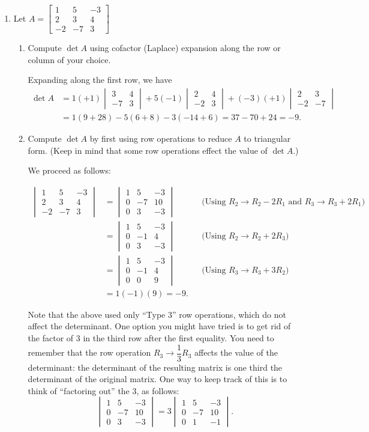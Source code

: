\documentclass[12pt]{article}
\newcommand{\bbm}{\begin{bmatrix}}
\newcommand{\ebm}{\end{bmatrix}}
\newcommand{\bvm}{\begin{vmatrix}}
\newcommand{\evm}{\end{vmatrix}}
\begin{document}
\thispagestyle{fancy}
 \begin{enumerate}
  \item Let $A = \bbm 1&5&-3\\2&3&4\\-2&-7&3\ebm$
\begin{enumerate}
 \item Compute $\det A$ using cofactor (Laplace) expansion along the row or column of your choice.

\bigskip

Expanding along the first row, we have
\begin{align*}
 \det A &= 1(+1)\bvm 3&4\\-7&3\evm + 5(-1)\bvm 2&4\\-2&3\evm + (-3)(+1)\bvm 2&3\\-2&-7\evm\\
&= 1(9+28)-5(6+8)-3(-14+6) = 37-70+24 = -9.
\end{align*}


 \item Compute $\det A$ by first using row operations to reduce $A$ to triangular form. (Keep in mind that some row operations effect the value of $\det A$.)

\bigskip

We proceed as follows:

\begin{align*}
 \bvm 1&5&-3\\2&3&4\\-2&-7&3 \evm & = \bvm 1&5&-3\\0&-7&10\\0&3&-3\evm & & \text{(Using $R_2\to R_2-2R_1$ and $R_3\to R_3 +2R_1$)}\\
& = \bvm 1&5&-3\\0&-1&4\\0&3&-3\evm & & \text{(Using } R_2\to R_2+2R_3)\\
& = \bvm 1&5&-3\\0&-1&4\\0&0&9\evm & & \text{(Using } R_3\to R_3+3R_2)\\
& = 1(-1)(9)=-9.
\end{align*}

Note that the above used only ``Type 3'' row operations, which do not affect the determinant. One option you might have tried is to get rid of the factor of 3 in the third row after the first equality. You need to remember that the row operation $R_3\to \dfrac{1}{3}R_3$ affects the value of the determinant: the determinant of the resulting matrix is one third the determinant of the original matrix. One way to keep track of this is to think of ``factoring out'' the 3, as follows:
\[
 \bvm 1&5&-3\\0&-7&10\\0&3&-3\evm = 3\bvm 1&5&-3\\0&-7&10\\0&1&-1\evm.
\]


\end{enumerate}
\end{enumerate}
\end{document}
